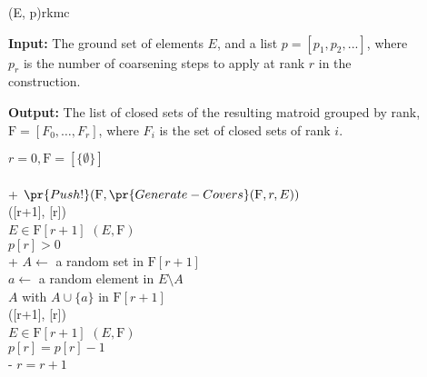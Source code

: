 \begin{algorithm}[float*=ht!]{(E, p)}{rkmc}

  \textbf{Input:}     \tab The ground set of elements $E$, and a list $p = [p_1, p_2, ...]$, where \\
  \mbox{}\tab $p_r$ is the number of coarsening steps to apply at rank $r$ in the \\
  \mbox{}\tab construction.

  \textbf{Output:}    \tab The list of closed sets of the resulting matroid grouped by rank, \\
  \mbox{}\tab $\mathrm{F} = [F_0, \ldots, F_r]$, where $F_i$ is the set of closed sets of rank $i$.

  \begin{pseudo}[label=\small\arabic*, indent-mark, line-height=1.2]
    $r = 0, \mathrm{F} = [\{ \emptyset \}]$ \\
       \\+
      $\pr{Push!}(\mathrm{F}, \pr{Generate-Covers}(\mathrm{F}, r, E))$ \\
      ([r+1], [r]) \\
      
       $E \in \mathrm{F}[r+1]$  $(E, \mathrm{F})$ \\
      
       $p[r] > 0$ \\+
        $A \leftarrow$ a random set in $\mathrm{F}[r+1]$ \\
        $a \leftarrow$ a random element in $E \setminus A$ \\
         $A$ with $A \cup \{a\}$ in $\mathrm{F}[r+1]$ \\
        ([r+1], [r]) \\

         $E \in \mathrm{F}[r+1]$  $(E, \mathrm{F})$ \\

        $p[r] = p[r] - 1$ \\-
      $r = r + 1$

  \end{pseudo}

\end{algorithm}


